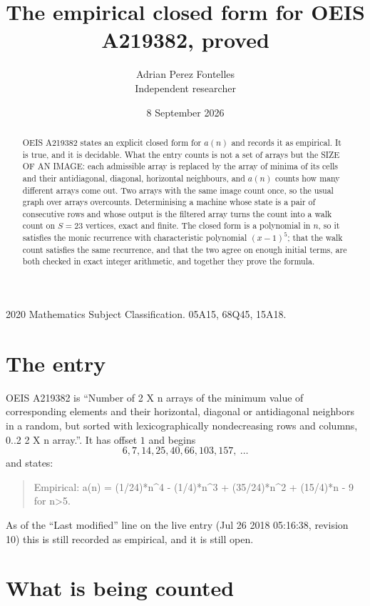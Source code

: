 \documentclass[11pt,a4paper]{article}
\title{The empirical closed form for OEIS A219382, proved}
\author{Adrian Perez Fontelles\\ \small Independent researcher}
\date{8 September 2026}
\theoremstyle{plain}
\theoremstyle{definition}
\begin{document}
\maketitle

\begin{abstract}
OEIS A219382 states an explicit closed form for $a(n)$ and records it as empirical. It is true, and
it is decidable. What the entry counts is not a set of arrays but the SIZE OF AN IMAGE: each
admissible array is replaced by the array of minima of its cells and their antidiagonal, diagonal, horizontal neighbours,
and $a(n)$ counts how many different arrays come out. Two arrays with the same image count
once, so the usual graph over arrays overcounts. Determinising a machine whose state is a pair
of consecutive rows and whose output is the filtered array turns the count into a walk count on
$S=23$ vertices, exact and finite. The closed form is a polynomial in $n$, so it satisfies the
monic recurrence with characteristic polynomial $(x-1)^{5}$; that the walk count
satisfies the same recurrence, and that the two agree on enough initial terms, are both checked
in exact integer arithmetic, and together they prove the formula.
\end{abstract}

\noindent\small 2020 Mathematics Subject Classification. 05A15, 68Q45, 15A18.\normalsize

\section{The entry}

OEIS A219382 is ``Number of 2 X n arrays of the minimum value of corresponding elements and their horizontal, diagonal or antidiagonal neighbors in a random, but sorted with lexicographically nondecreasing rows and columns, 0..2 2 X n array.''. It has offset $1$ and begins
\[
6, 7, 14, 25, 40, 66, 103, 157,\ \dots
\]
and states:
\begin{quote}
Empirical: a(n) = (1/24)*n\^{}4 - (1/4)*n\^{}3 + (35/24)*n\^{}2 + (15/4)*n - 9 for n>5.
\end{quote}
As of the ``Last modified'' line on the live entry (Jul 26 2018 05:16:38, revision 10)
this is still recorded as empirical, and it is still open.

\section{What is being counted}
\end{document}

